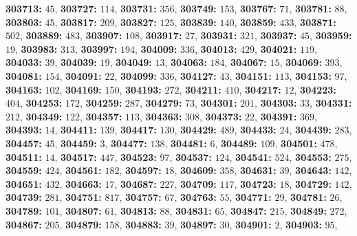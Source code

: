 \textsf{\bfseries 303713:} $45$, \textsf{\bfseries 303727:} $114$, \textsf{\bfseries 303731:} $356$, \textsf{\bfseries 303749:} $153$, \textsf{\bfseries 303767:} $71$, \textsf{\bfseries 303781:} $88$, \textsf{\bfseries 303803:} $45$, \textsf{\bfseries 303817:} $209$, \textsf{\bfseries 303827:} $125$, \textsf{\bfseries 303839:} $140$, \textsf{\bfseries 303859:} $433$, \textsf{\bfseries 303871:} $502$, \textsf{\bfseries 303889:} $483$, \textsf{\bfseries 303907:} $108$, \textsf{\bfseries 303917:} $27$, \textsf{\bfseries 303931:} $321$, \textsf{\bfseries 303937:} $45$, \textsf{\bfseries 303959:} $19$, \textsf{\bfseries 303983:} $313$, \textsf{\bfseries 303997:} $194$, \textsf{\bfseries 304009:} $336$, \textsf{\bfseries 304013:} $429$, \textsf{\bfseries 304021:} $119$, \textsf{\bfseries 304033:} $39$, \textsf{\bfseries 304039:} $19$, \textsf{\bfseries 304049:} $13$, \textsf{\bfseries 304063:} $184$, \textsf{\bfseries 304067:} $15$, \textsf{\bfseries 304069:} $393$, \textsf{\bfseries 304081:} $154$, \textsf{\bfseries 304091:} $22$, \textsf{\bfseries 304099:} $336$, \textsf{\bfseries 304127:} $43$, \textsf{\bfseries 304151:} $113$, \textsf{\bfseries 304153:} $97$, \textsf{\bfseries 304163:} $102$, \textsf{\bfseries 304169:} $150$, \textsf{\bfseries 304193:} $272$, \textsf{\bfseries 304211:} $410$, \textsf{\bfseries 304217:} $12$, \textsf{\bfseries 304223:} $404$, \textsf{\bfseries 304253:} $172$, \textsf{\bfseries 304259:} $287$, \textsf{\bfseries 304279:} $73$, \textsf{\bfseries 304301:} $201$, \textsf{\bfseries 304303:} $33$, \textsf{\bfseries 304331:} $212$, \textsf{\bfseries 304349:} $122$, \textsf{\bfseries 304357:} $113$, \textsf{\bfseries 304363:} $308$, \textsf{\bfseries 304373:} $22$, \textsf{\bfseries 304391:} $369$, \textsf{\bfseries 304393:} $14$, \textsf{\bfseries 304411:} $139$, \textsf{\bfseries 304417:} $130$, \textsf{\bfseries 304429:} $489$, \textsf{\bfseries 304433:} $24$, \textsf{\bfseries 304439:} $283$, \textsf{\bfseries 304457:} $45$, \textsf{\bfseries 304459:} $3$, \textsf{\bfseries 304477:} $138$, \textsf{\bfseries 304481:} $6$, \textsf{\bfseries 304489:} $109$, \textsf{\bfseries 304501:} $478$, \textsf{\bfseries 304511:} $14$, \textsf{\bfseries 304517:} $447$, \textsf{\bfseries 304523:} $97$, \textsf{\bfseries 304537:} $124$, \textsf{\bfseries 304541:} $524$, \textsf{\bfseries 304553:} $275$, \textsf{\bfseries 304559:} $424$, \textsf{\bfseries 304561:} $182$, \textsf{\bfseries 304597:} $18$, \textsf{\bfseries 304609:} $358$, \textsf{\bfseries 304631:} $39$, \textsf{\bfseries 304643:} $142$, \textsf{\bfseries 304651:} $432$, \textsf{\bfseries 304663:} $17$, \textsf{\bfseries 304687:} $227$, \textsf{\bfseries 304709:} $117$, \textsf{\bfseries 304723:} $18$, \textsf{\bfseries 304729:} $142$, \textsf{\bfseries 304739:} $281$, \textsf{\bfseries 304751:} $817$, \textsf{\bfseries 304757:} $67$, \textsf{\bfseries 304763:} $55$, \textsf{\bfseries 304771:} $29$, \textsf{\bfseries 304781:} $26$, \textsf{\bfseries 304789:} $101$, \textsf{\bfseries 304807:} $61$, \textsf{\bfseries 304813:} $88$, \textsf{\bfseries 304831:} $65$, \textsf{\bfseries 304847:} $215$, \textsf{\bfseries 304849:} $272$, \textsf{\bfseries 304867:} $205$, \textsf{\bfseries 304879:} $158$, \textsf{\bfseries 304883:} $39$, \textsf{\bfseries 304897:} $30$, \textsf{\bfseries 304901:} $2$, \textsf{\bfseries 304903:} $95$, 

